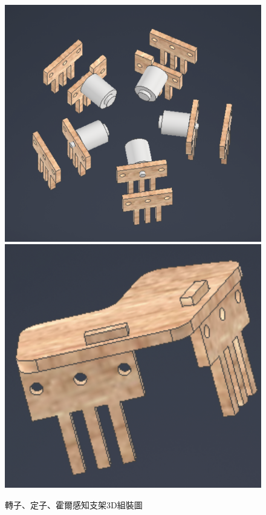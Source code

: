 \documentclass[12pt,a4paper]{article}
\begin{document}
\begin{CJK*}{UTF8}{bkai}
\begin{enumerate}
\begin{figure}[h]
                  \includegraphics[height=0.18\textheight]{./images/stator_3d.png}
                  \includegraphics[height=0.18\textheight]{./images/hall_frame_3d.png}
                  \caption{轉子、定子、霍爾感知支架3D組裝圖}
              \end{figure}
              \begin{figure}[h]

\end{figure}
\end{enumerate}
\end{CJK*}
\end{document}
